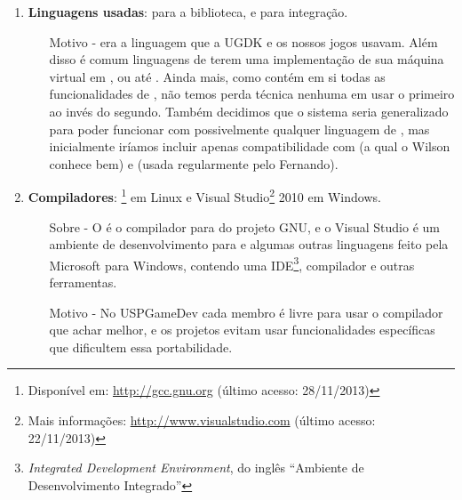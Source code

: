   \begin{enumerate}

    \item \textbf{Linguagens usadas}: \CXX{} para a biblioteca,  e
       para integração.
      \begin{itemize}
        \item[Motivo -]
          \CXX{} era a linguagem que a UGDK e os nossos
          jogos usavam. Além disso é comum linguagens de \script{} terem uma
          implementação de sua máquina virtual em \C{}, ou até \CXX{}. Ainda
          mais, como \CXX{} contém em si todas as funcionalidades de \C{},
          não temos perda técnica nenhuma em usar o primeiro ao invés do segundo.
          Também decidimos que o sistema seria generalizado para poder
          funcionar com possivelmente qualquer linguagem de \script{}, mas
          inicialmente iríamos incluir apenas compatibilidade com 
          (a qual o Wilson conhece bem) e  (usada regularmente
          pelo Fernando).
      \end{itemize}

    \item \textbf{Compiladores}: \footnote{Disponível em:
      \url{http://gcc.gnu.org} (último acesso: 28/11/2013)} em Linux e Visual
      Studio\footnote{Mais informações: \url{http://www.visualstudio.com} (último
      acesso: 22/11/2013)} 2010 em Windows.
      \begin{itemize}
        \item[Sobre -]
          O  é o compilador para \CXX{} do projeto GNU, e o Visual Studio
          é um ambiente de desenvolvimento para \CXX{} e algumas outras linguagens
          feito pela Microsoft para Windows, contendo uma IDE\footnote{\textit{Integrated
          Development Environment}, do inglês ``Ambiente de Desenvolvimento Integrado''},
          compilador e outras ferramentas.
        \item[Motivo -]
          No USPGameDev cada membro é livre para usar o compilador que achar melhor,
          e os projetos evitam usar funcionalidades específicas que dificultem
          essa portabilidade.
      \end{itemize}


\end{enumerate}
